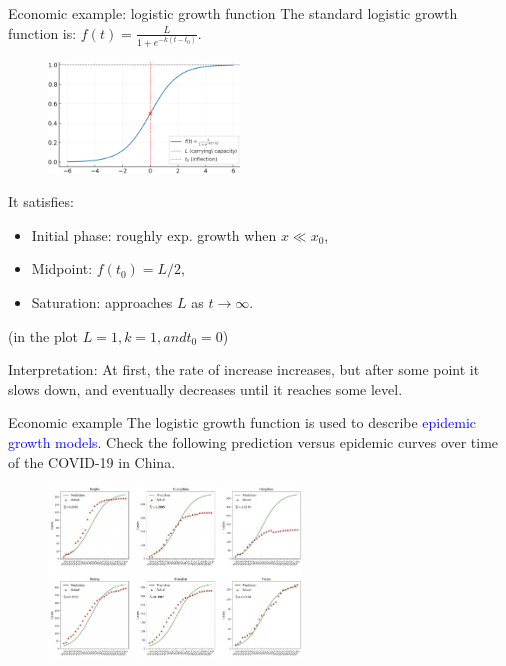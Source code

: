 \documentclass[11pt,aspectratio=169]{beamer}
\begin{document}
\begin{frame}{Economic example: logistic growth function}
The standard logistic growth function is: 
$f(t) = \frac{L}{1 + e^{-k(t - t_0)}}$.\\[3mm]
\begin{minipage}{6cm}{}
	\begin{figure}
\includegraphics[width=2in]{img/returns1.png} 
\end{figure}
\end{minipage}\begin{minipage}{9cm}{}
	It satisfies:
	\begin{itemize}
		\item Initial phase: roughly exp. growth when $x \ll x_0$,
		\item Midpoint: $f(t_0) = L/2$,
		\item Saturation: approaches $L$ as $t \to \infty$.
	\end{itemize}
	(in the plot $L = 1, k = 1, and t_0 = 0$)
\end{minipage}

Interpretation: At first, the rate of increase increases, but after some point it slows down, and eventually decreases  until it reaches some level. 
\end{frame}

\begin{frame}{Economic example}
The logistic growth function is used to describe \textcolor{blue}{epidemic growth models}.  Check the following prediction versus epidemic curves over time of the  COVID-19 in China.
\begin{figure}
\includegraphics[width=0.60\textwidth]{img/figure}
\end{figure}
\end{frame}
\end{document}
